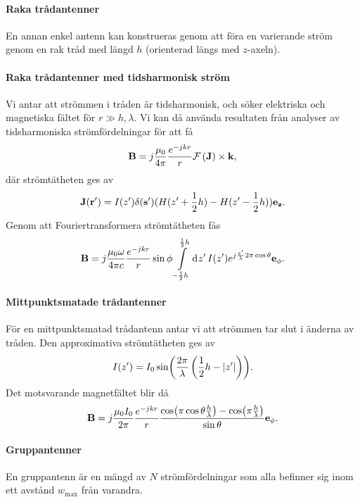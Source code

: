 \paragraph{Raka trådantenner}
En annan enkel antenn kan konstrueras genom att föra en varierande ström genom en rak tråd med längd $h$ (orienterad längs med $z$-axeln).

\paragraph{Raka trådantenner med tidsharmonisk ström}
Vi antar att strömmen i tråden är tidsharmonisk, och söker elektriska och magnetiska fältet för $r \gg h, \lambda$. Vi kan då använda resultaten från analyser av tidsharmoniska strömfördelningar för att få
\begin{align*}
	\vb{B} = j\frac{\mu_{0}}{4\pi}\frac{e^{-jkr}}{r}\mathcal{F}\left(\vb{J}\right)\times\vb{k},
\end{align*}
där strömtätheten ges av
\begin{align*}
	\vb{J}(\vb{r}') = I(z')\delta(\vb{s}')(H(z' + \frac{1}{2}h) - H(z' - \frac{1}{2}h))\vb{e}_{\vb{z}}.
\end{align*}
Genom att Fouriertransformera strömtätheten fås
\begin{align*}
	\vb{B} = j\frac{\mu_{0}\omega}{4\pi c}\frac{e^{-jkr}}{r}\sin{\phi}\int\limits_{-\frac{1}{2}h}^{\frac{1}{2}h}\dd[]{z'}I(z')e^{j\frac{z'}{\lambda}2\pi\cos{\theta}}\vb{e}_{\vb{\phi}}.
\end{align*}

\paragraph{Mittpunktsmatade trådantenner}
För en mittpunktsmatad trådantenn antar vi att strömmen tar slut i änderna av tråden. Den approximativa strömtätheten ges av
\begin{align*}
	I(z') = I_{0}\sin(\frac{2\pi}{\lambda}\left(\frac{1}{2}h - \abs{z'}\right)).
\end{align*}
Det motsvarande magnetfältet blir då
\begin{align*}
	\vb{B} = j\frac{\mu_{0}I_{0}}{2\pi}\frac{e^{-jkr}}{r}\frac{\cos(\pi\cos{\theta}\frac{h}{\lambda}) - \cos(\pi\frac{h}{\lambda})}{\sin{\theta}}\vb{e}_{\vb{\phi}}.
\end{align*}

\paragraph{Gruppantenner}
En gruppantenn är en mängd av $N$ strömfördelningar som alla befinner sig inom ett avstånd $w_{\text{max}}$ från varandra.

